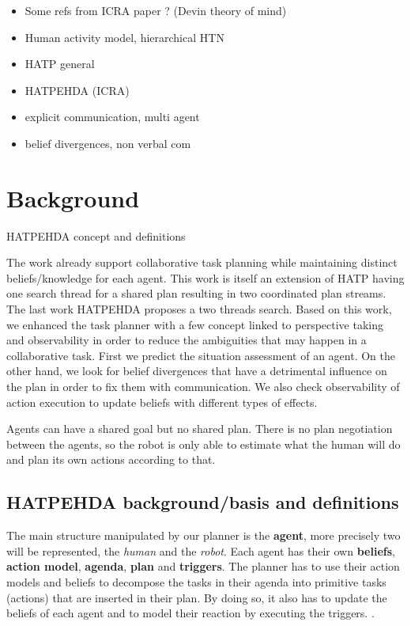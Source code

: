 \documentclass[letterpaper]{article} %
\begin{document}
\begin{itemize}
    \item Some refs from ICRA paper ? (Devin theory of mind) 
    \item Human activity model, hierarchical HTN
    \item HATP general
    \item HATPEHDA (ICRA)
    \item explicit communication, multi agent 
    \item belief divergences, non verbal com
\end{itemize}

\section{Background}
HATPEHDA concept and definitions

The work \cite{buisan:hal-03684211} already support collaborative task planning while maintaining distinct beliefs/knowledge for each agent. This work is itself an extension of HATP \cite{hatp?} having one search thread for a shared plan resulting in two coordinated plan streams. The last work HATPEHDA proposes a two threads search. Based on this work, we enhanced the task planner with a few concept linked to perspective taking and observability in order to reduce the ambiguities that may happen in a collaborative task. First we predict the situation assessment of an agent. On the other hand, we look for belief divergences that have a detrimental influence on the plan in order to fix them with communication. We also check observability of action execution to update beliefs with different types of effects.

Agents can have a shared goal but no shared plan. There is no plan negotiation between the agents, so the robot is only able to estimate what the human will do and plan its own actions according to that.

\subsection{HATPEHDA background/basis and definitions}

The main structure manipulated by our planner is the \textbf{agent}, more precisely two will be represented, the \textit{human} and the \textit{robot}. Each agent has their own \textbf{beliefs}, \textbf{action model}, \textbf{agenda}, \textbf{plan} and \textbf{triggers}. The planner has to use their action models and beliefs to decompose the tasks in their agenda into primitive tasks (actions) that are inserted in their plan. By doing so, it also has to update the beliefs of each agent and to model their reaction by executing the triggers. \cite{buisan:hal-03684211}.
\end{document}
